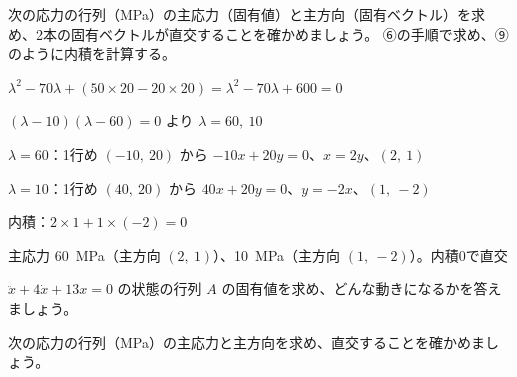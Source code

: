 \begin{reidai}
次の応力の行列（MPa）の主応力（固有値）と主方向（固有ベクトル）を求め、2本の固有ベクトルが直交することを確かめましょう。
\kangaekata ⑥の手順で求め、⑨のように内積を計算する。\par
\shiki\kviiis{}\zw{} $\lambda^2-70\lambda+(50\times20-20\times20)=\lambda^2-70\lambda+600=0$\par
\kviiib $(\lambda-10)(\lambda-60)=0$ より $\lambda=60,\ 10$\par
\kviiia $\lambda=60$：1行め $(-10,\ 20)$ から $-10x+20y=0$、$x=2y$、$(2,\ 1)$\par
\kviiia $\lambda=10$：1行め $(40,\ 20)$ から $40x+20y=0$、$y=-2x$、$(1,\ -2)$\par
\kviiia 内積：$2\times1+1\times(-2)=0$\par
\kotae\kviiis{}\zw{} 主応力 \qty{60}{MPa}（主方向 $(2,\ 1)$）、\qty{10}{MPa}（主方向 $(1,\ -2)$）。内積0で直交
\end{reidai}

\begingroup{}%
\noindent\begin{minipage}[t]{0.485\linewidth}\vspace{0pt}
\begin{jibun}
$\ddot x+4\dot x+13x=0$ の状態の行列 $A$ の固有値を求め、どんな動きになるかを答えましょう。
\end{jibun}
\end{minipage}\hfill
\begin{minipage}[t]{0.485\linewidth}\vspace{0pt}
\begin{jibun}
次の応力の行列（MPa）の主応力と主方向を求め、直交することを確かめましょう。
\end{jibun}
\end{minipage}\par
\endgroup

